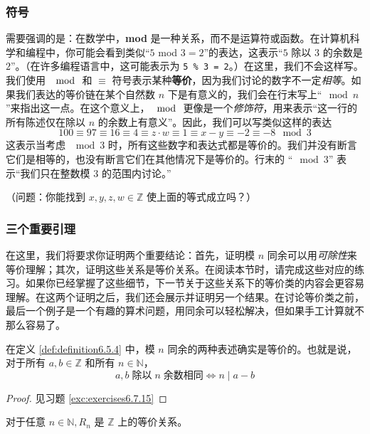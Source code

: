 \subsubsection*{符号}

需要强调的是：在数学中，\textbf{mod} 是一种关系，而不是运算符或函数。在计算机科学和编程中，你可能会看到类似``$5$ mod $3 = 2$''的表达，这表示``$5$ 除以 $3$ 的余数是 $2$''。（在许多编程语言中，这可能表示为 \verb|5 % 3 = 2|。）在这里，我们不会这样写。我们使用 $\mod$ 和 $\equiv$ 符号表示某种\textbf{等价}，因为我们讨论的数字不一定\emph{相等}。如果我们表达的等价链在某个自然数 $n$ 下是有意义的，我们会在行末写上``$\mod n$''来指出这一点。在这个意义上，$\mod$ 更像是一个\emph{修饰符}，用来表示``这一行的所有陈述仅在除以 $n$ 的余数上有意义''。因此，我们可以写类似这样的表达
\[100 \equiv 97 \equiv 16 \equiv 4 \equiv z \cdot w \equiv 1 \equiv x - y \equiv -2 \equiv -8 \mod 3\]
这表示当考虑 $\mod 3$ 时，所有这些数字和表达式都是等价的。我们并没有断言它们是相等的，也没有断言它们在其他情况下是等价的。行末的 ``$\mod 3$'' 表示``我们只在整数模 $3$ 的范围内讨论。''

（问题：你能找到 $x, y, z, w \in \mathbb{Z}$ 使上面的等式成立吗？）

\subsubsection*{三个重要引理}

在这里，我们将要求你证明两个重要结论：首先，证明模 $n$ 同余可以用\emph{可除性}来等价理解；其次，证明这些关系是等价关系。在阅读本节时，请完成这些对应的练习。如果你已经掌握了这些细节，下一节关于这些关系下的等价类的内容会更容易理解。在这两个证明之后，我们还会展示并证明另一个结果。在讨论等价类之前，最后一个例子是一个有趣的算术问题，用同余可以轻松解决，但如果手工计算就不那么容易了。

\begin{lemma}\label{lemma6.5.8}
    在定义 \ref{def:definition6.5.4} 中，模 $n$ 同余的两种表述确实是等价的。也就是说，对于所有 $a, b \in \mathbb{Z}$ 和所有 $n \in \mathbb{N}$，
    \[a, b \;\text{除以}\; n \;\text{余数相同} \iff n \mid a - b\]
\end{lemma}

\begin{proof}
    见习题 \ref{exc:exercises6.7.15}
\end{proof}

\begin{lemma}\label{lemma6.5.9}
    对于任意 $n \in \mathbb{N}, R_n$ 是 $\mathbb{Z}$ 上的等价关系。
\end{lemma}

